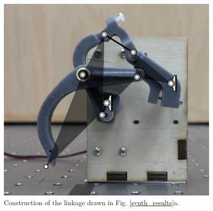 \documentclass[journal]{IEEEtran}
\begin{document}
\begin{figure}[!t]
\centering
\includegraphics[scale=0.3]{prototype_overlay}
\caption{Construction of the linkage drawn in Fig. \ref{synth_results}a.}
\label{prototype_overlay}
\end{figure}
\end{document}
